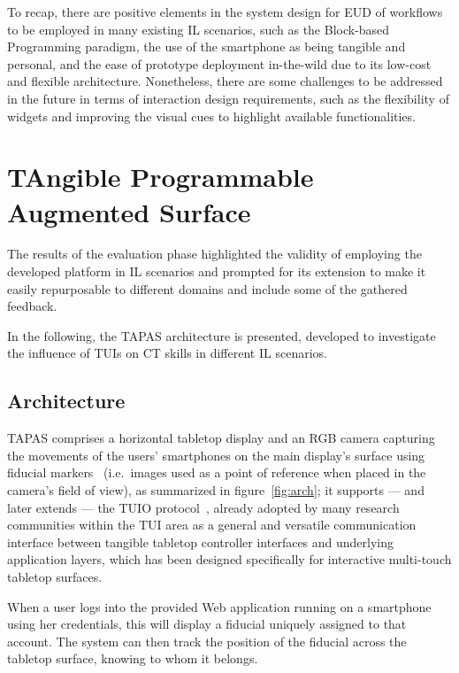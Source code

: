 To recap, there are positive elements in the system design for \ac{EUD} of workflows to be employed in many existing \ac{IL} scenarios, such as the Block-based Programming paradigm, the use of the smartphone as being tangible and personal, and the ease of prototype deployment in-the-wild due to its low-cost and flexible architecture. Nonetheless, there are some challenges to be addressed in the future in terms of interaction design requirements, such as the flexibility of widgets and improving the visual cues to highlight available functionalities.

\section{TAngible Programmable Augmented Surface}\label{sec:tapas}
The results of the evaluation phase highlighted the validity of employing the developed platform in \ac{IL} scenarios and prompted for its extension to make it easily repurposable to different domains and include some of the gathered feedback.

In the following, the \ac{TAPAS} architecture is presented, developed to investigate the influence of \acp{TUI} on \ac{CT} skills in different \ac{IL} scenarios.

\subsection{Architecture}\label{sec:tapasarch}
\acs{TAPAS} comprises a horizontal tabletop display and an RGB camera capturing the movements of the users' smartphones on the main display's surface using fiducial markers~\cite{chilitags} (i.e.\ images used as a point of reference when placed in the camera's field of view), as summarized in figure~\ref{fig:arch}; it supports --- and later extends --- the \ac{TUIO} protocol~\cite{kaltenbrunner2005tuio}, already adopted by many research communities within the \ac{TUI} area as a general and versatile communication interface between tangible tabletop controller interfaces and underlying application layers, which has been designed specifically for interactive multi-touch tabletop surfaces.

When a user logs into the provided Web application running on a smartphone using her credentials, this will display a fiducial uniquely assigned to that account. The system can then track the position of the fiducial across the tabletop surface, knowing to whom it belongs.

